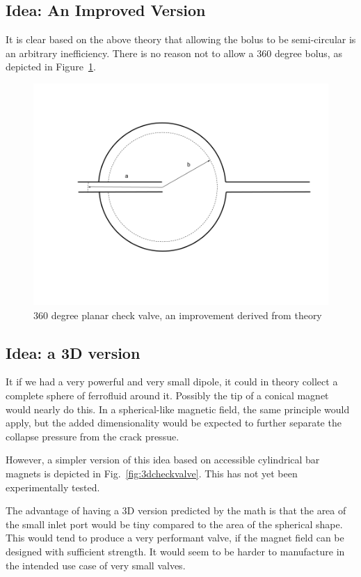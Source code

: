 \documentclass[]{asme2ej}
\begin{document}
\subsection{Idea: An Improved Version}

It is clear based on the above theory that allowing the bolus to be semi-circular
is an arbitrary inefficiency. There is no reason not to allow a 360 degree bolus,
as depicted in Figure~\ref{fig:360}.

\begin{figure}
\centerline{\includegraphics[width=6in]{figure/360degreeplanarcheckvalve.png}}
\caption{360 degree planar check valve, an improvement derived from theory}
\label{fig:360}
\end{figure}

\subsection{Idea: a 3D version}

It if we had a very powerful and very small dipole, it could in theory
collect a complete sphere of ferrofluid around it. Possibly the tip
of a conical magnet would nearly do this.
In a spherical-like magnetic field, the same principle would
apply, but the added dimensionality would be expected to further
separate the collapse pressure from the crack pressue.

However, a simpler version of this idea based on accessible
cylindrical bar magnets is depicted in Fig.~\ref{fig:3dcheckvalve}.
This has not yet been experimentally tested.

The advantage of having a 3D version predicted by the math is that the area
of the small inlet port would be tiny compared to the area of the spherical
shape. This would tend to produce a very performant valve, if the magnet
field can be designed with sufficient strength. It would seem to be harder
to manufacture in the intended use case of very small valves.
\end{document}
